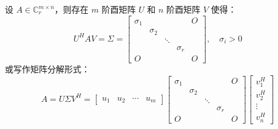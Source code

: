 \begin{theorem}[一般矩阵的奇异值分解]
设 $A\in\mathbb C^{m\times n}_r$，则存在 $m$ 阶酉矩阵 $U$ 和 $n$ 阶酉矩阵 $V$ 使得：
\[
    U^HAV=\Sigma=\begin{bmatrix}
    \sigma_1&&&&O\\
    &\sigma_2&&&\\
    &&\ddots&&\\
    &&&\sigma_r&\\
    O&&&&O
    \end{bmatrix},\quad\sigma_i>0
\]
或写作矩阵分解形式：
\[
    A=U\Sigma V^H=
    \begin{bmatrix}
    u_1&u_2&\cdots&u_m
    \end{bmatrix}\begin{bmatrix}
    \sigma_1&&&&O\\
    &\sigma_2&&&\\
    &&\ddots&&\\
    &&&\sigma_r&\\
    O&&&&O
    \end{bmatrix}
    \begin{bmatrix}
    v_1^H\\v_2^H\\\vdots\\v_n^H
    \end{bmatrix}
\]
\end{theorem}
